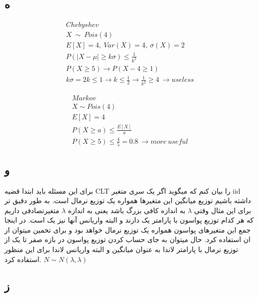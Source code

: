 \documentclass{article}[12pt]
\begin{document}
\subsection{ه}
\begin{equation}
	\begin{gathered}
				Chebyshev\ \\
				X\ \sim \ Pois( 4)\\
				E[ X] =4,\ Var( X) =4,\ \sigma ( X) =2\\
				P( |X-\mu |\geqslant k\sigma ) \leqslant \frac{1}{k^{2}}\\
				P( X\geqslant 5)\rightarrow P( X-4\geqslant 1)\\
				k\sigma =2k\leqslant 1\rightarrow k\leqslant \frac{1}{2}\rightarrow \frac{1}{k^{2}} \geqslant 4\ \rightarrow useless
	\end{gathered}
\end{equation}

\begin{equation}
	\begin{gathered}
			Markov\\
			X\sim Pois( 4)\\
			E[ X] =4\\
			P( X\geqslant a) \leqslant \frac{E[ X]}{a}\\
			P( X\geqslant 5) \leqslant \frac{4}{5} =0.8\ \rightarrow more\ useful
	\end{gathered}
\end{equation}
\subsection{و}
برای این مسئله باید ابتدا قضیه CLT را بیان کنم که میگوید اگر یک سری متغیر iid داشته باشیم توزیع میانگین این متغیرها همواره یک توزیع نرمال است. به طور دقیق تر برای این مثال وقتی 
$\lambda$
به اندازه کافی بزرگ باشد یعنی به اندازه 
$\lambda$
متغیرتصادفی داریم که هر کدام توزیع پواسون با پارامتر یک دارند و البته واریانس آنها نیز یک است. در اینجا جمع این متغیرهای پواسون همواره یک توزیع نرمال خواهد بود و برای تخمین میتوان از ان استفاده کرد. حال میتوان به جای حساب کردن توزیع پواسون در بازه صفر تا یک از توزیع نرمال با پارامتر لاندا به عنوان میانگین و البته واریانس لاندا برای این منظور استفاده کرد.
$N \sim N(\lambda,\lambda)$
\subsection{ز}
\end{document}

